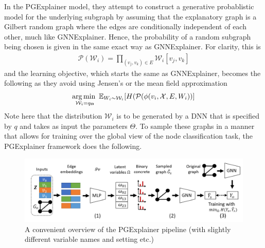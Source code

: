 In the PGExplainer model, they attempt to construct a generative probablistic model for the underlying subgraph by assuming that the explanatory graph is a Gilbert random graph \cite{gilbert_random_1959} where the edges are conditionally independent of each other, much like GNNExplainer. Hence, the probability of a random subgraph being chosen is given in the same exact way as GNNExplainer. For clarity, this is
\begin{align*}
	\mathcal{P}(\mathcal{W}_i) = \prod_{(v_j, v_k) \in E} \mathcal{W}_i[v_j, v_k]
\end{align*}
and the learning objective, which starts the same as GNNExplainer, becomes the following as they avoid using Jensen's or the mean field approximation
\begin{align*}
	\operatorname*{arg\,min\,\,}_{\mathcal{W}_i = q_{\Theta}} \mathbb{E}_{W_i \sim \mathcal{W}_i}[H(\mathcal{P}(\phi(v_i, \mathcal{X}, E, W_i))]
\end{align*}
Note here that the distribution $\mathcal{W}_i$ is to be generated by a DNN that is specified by $q$ and takes as input the parameters $\Theta$. To sample these graphs in a manner that allows for training over the global view of the node classification task, the PGExplainer framework does the following.
\begin{figure}[t]
	\centering
	\includegraphics[width=\textwidth]{images/pgexp.png}
	\caption{A convenient overview of the PGExplainer pipeline (with slightly different variable names and setting etc.) \cite{luo_parameterized_2020}}
	\label{fig:pgexp}
\end{figure}
